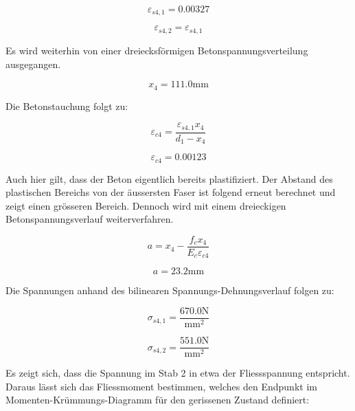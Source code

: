 \documentclass[
  12pt,
  letterpaper,
  egregdoesnotlikesansseriftitles]{scrreprt}
\begin{document}
\begin{equation}\varepsilon_{s4,1} = 0.00327\end{equation}

\begin{equation}\varepsilon_{s4,2} = \varepsilon_{s4,1}\end{equation}

Es wird weiterhin von einer dreiecksförmigen Betonspannungsverteilung
ausgegangen.

\begin{equation}x_{4} = 111.0 \text{mm}\end{equation}

Die Betonstauchung folgt zu:

\begin{equation}\varepsilon_{c4} = \frac{\varepsilon_{s4,1} x_{4}}{d_{1} - x_{4}}\end{equation}

\begin{equation}\varepsilon_{c4} = 0.00123\end{equation}

Auch hier gilt, dass der Beton eigentlich bereits plastifiziert. Der
Abstand des plastischen Bereichs von der äussersten Faser ist folgend
erneut berechnet und zeigt einen grösseren Bereich. Dennoch wird mit
einem dreieckigen Betonspannungsverlauf weiterverfahren.

\begin{equation}a = x_{4} - \frac{f_{c} x_{4}}{E_{c} \varepsilon_{c4}}\end{equation}

\begin{equation}a = 23.2 \text{mm}\end{equation}

Die Spannungen anhand des bilinearen Spannungs-Dehnungsverlauf folgen
zu:

\begin{equation}\sigma_{s 4,1} = \frac{670.0 \text{N}}{\text{mm}^{2}}\end{equation}

\begin{equation}\sigma_{s 4,2} = \frac{551.0 \text{N}}{\text{mm}^{2}}\end{equation}

Es zeigt sich, dass die Spannung im Stab 2 in etwa der Fliessspannung
entspricht. Daraus lässt sich das Fliessmoment bestimmen, welches den
Endpunkt im Momenten-Krümmungs-Diagramm für den gerissenen Zustand
definiert:
\end{document}
